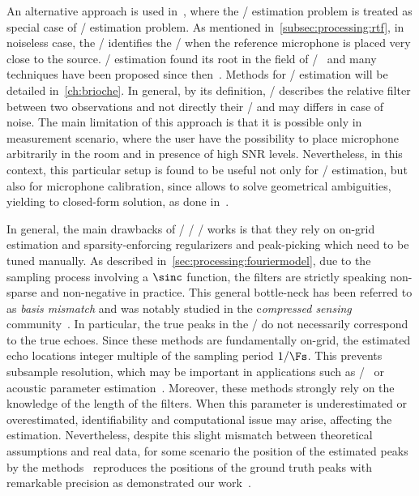 \mynewline
An alternative approach is used in~, where the \RIR/ estimation problem is treated as special case of \RTF/ estimation problem.
As mentioned in~\cref{subsec:processing:rtf}, in noiseless case, the \RTF/ identifies the \RIR/ when the reference microphone is placed very close to the source.
\RTF/ estimation found its root in the field of \SEdef/~ and many techniques have been proposed since then~.
Methods for \RTF/ estimation will be detailed in~\cref{ch:brioche}.
In general, by its definition, \RTF/ describes the relative filter between two observations and not directly their \RIRs/ and may differs in case of noise.
The main limitation of this approach is that it is possible only in measurement scenario, where the user have the possibility to place microphone arbitrarily in the room and in presence of high SNR levels.
Nevertheless, in this context, this particular setup is found to be useful not only for \RTF/ estimation, but also for microphone calibration, since allows to solve geometrical ambiguities, yielding to closed-form solution, as done in~.

\mynewline
In general, the main drawbacks of \FIR/ \SIMO/ \BCE/ works is that they rely on on-grid estimation and sparsity-enforcing regularizers and peak-picking which need to be tuned manually.
As described in~\cref{sec:processing:fouriermodel}, due to the sampling process involving a $\sinc$ function, the filters are strictly speaking non-sparse and non-negative in practice.
This general bottle-neck has been referred to as \textit{basis mismatch} and was notably studied in the c\textit{ompressed sensing} community~.
In particular, the true peaks in the \RIR/ do not necessarily correspond to the true echoes.
Since these methods are fundamentally on-grid, the estimated echo locations integer multiple of the sampling period $1/\Fs$.
This prevents subsample resolution, which may be important in applications such as \RooGE/~ or acoustic parameter estimation~.
Moreover, these methods strongly rely on the knowledge of the length of the filters.
When this parameter is underestimated or overestimated, identifiability and computational issue may arise, affecting the estimation.
Nevertheless, despite this slight mismatch between theoretical assumptions and real data, for some scenario the position of the estimated peaks by the methods~ reproduces the positions of the ground truth peaks with remarkable precision as demonstrated our work~\cite{di2020blaster}.

